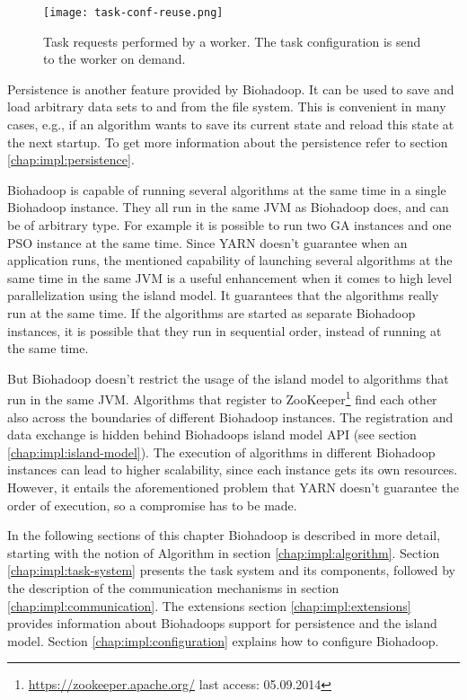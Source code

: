 \begin{figure}
  \centering
  \texttt{[image: task-conf-reuse.png]}
  \caption[Task requests performed by a worker]{Task requests performed by a worker. The task configuration is send to the worker on demand.}
  \label{fig:task-conf-reuse}
\end{figure}

Persistence is another feature provided by Biohadoop. It can be used to save and load arbitrary data sets to and from the file system. This is convenient in many cases, e.g., if an algorithm wants to save its current state and reload this state at the next startup. To get more information about the persistence refer to section \ref{chap:impl:persistence}.

Biohadoop is capable of running several algorithms at the same time in a single Biohadoop instance. They all run in the same JVM as Biohadoop does, and can be of arbitrary type. For example it is possible to run two GA instances and one PSO instance at the same time. Since YARN doesn't guarantee when an application runs, the mentioned capability of launching several algorithms at the same time in the same JVM is a useful enhancement when it comes to high level parallelization using the island model. It guarantees that the algorithms really run at the same time. If the algorithms are started as separate Biohadoop instances, it is possible that they run in sequential order, instead of running at the same time.

But Biohadoop doesn't restrict the usage of the island model to algorithms that run in the same JVM. Algorithms that register to ZooKeeper\footnote{\url{https://zookeeper.apache.org/} last access: 05.09.2014} find each other also across the boundaries of different Biohadoop instances. The registration and data exchange is hidden behind Biohadoops island model API (see section \ref{chap:impl:island-model}). The execution of algorithms in different Biohadoop instances can lead to higher scalability, since each instance gets its own resources. However, it entails the aforementioned problem that YARN doesn't guarantee the order of execution, so a compromise has to be made.

In the following sections of this chapter Biohadoop is described in more detail, starting with the notion of Algorithm in section \ref{chap:impl:algorithm}. Section \ref{chap:impl:task-system} presents the task system and its components, followed by the description of the communication mechanisms in section \ref{chap:impl:communication}. The extensions section \ref{chap:impl:extensions} provides information about Biohadoops support for persistence and the island model. Section \ref{chap:impl:configuration} explains how to configure Biohadoop.

